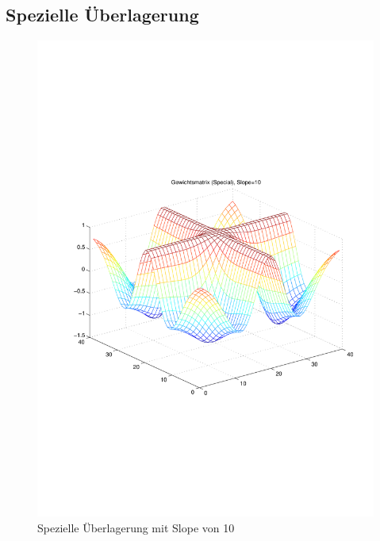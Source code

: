 \subsection{Spezielle Überlagerung}
\begin{figure}[hbt]
	\begin{minipage}{0.5 \textwidth}
		\includegraphics[width=\textwidth]{./Bilder/Auswertung/Gewichtsmatrix/Gewichtsmatrix_Special_Slope_10}
		\caption{Spezielle Überlagerung mit Slope von 10}
		\label{Spez210}
	\end{minipage}
	\hfill
	\begin{minipage}{0.5 \textwidth}

\end{minipage}
\end{figure}
